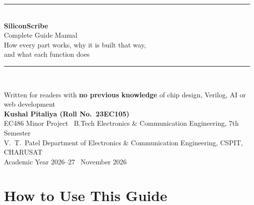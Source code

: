 \documentclass[11pt,a4paper,oneside]{report}
\begin{document}
\begin{titlepage}
\centering
\vspace*{2.2cm}
{\color{navy}\rule{\textwidth}{1.2pt}}\\[14pt]
{\Huge\bfseries\color{navy} SiliconScribe}\\[10pt]
{\LARGE Complete Guide Manual}\\[8pt]
{\large How every part works, why it is built that way,\\ and what each function does}\\[14pt]
{\color{navy}\rule{\textwidth}{1.2pt}}\\[2.2cm]


\vfill
{\large Written for readers with \textbf{no previous knowledge} of chip design, Verilog, AI or web development}\\[1.2cm]
{\large\bfseries Kushal Pitaliya \quad(Roll No.\ 23EC105)}\\[4pt]
EC486 Minor Project \textbullet\ B.Tech Electronics \& Communication Engineering, 7th Semester\\[2pt]
V.\ T.\ Patel Department of Electronics \& Communication Engineering, CSPIT, CHARUSAT\\[2pt]
Academic Year 2026--27 \textbullet\ November 2026
\end{titlepage}

\tableofcontents
\clearpage

\chapter*{How to Use This Guide}
\end{document}
